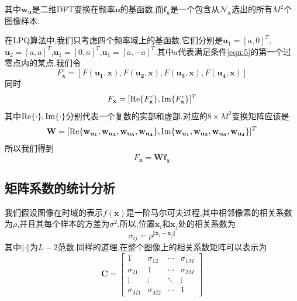 \documentclass[UTF8,adobefonts]{ctexart}
\def\Re{\mathop{\rm Re}}
\def\Im{\mathop{\rm Im}}
\begin{document}
其中$\mathbf{w}_\mathbf{u}$是二维DFT变换在频率$\mathbf{u}$的基函数,而$\mathbf{f}_\mathbf{x}$是一个包含从$\mathcal{N}_\mathbf{x}$选出的所有$M^2$个图像样本.

在LPQ算法中,我们只考虑四个频率域上的基函数,它们分别是$\mathbf{u}_1 = [a,0]^T$,$\mathbf{u}_2 = [a,a]^T$,$\mathbf{u}_1 = [0,a]^T$,$\mathbf{u}_1 = [a,-a]^T$.其中$a$代表满足条件\ref{eqn:5}的第一个过零点内的某点.我们令
\begin{equation}\label{eq:7}
F_\mathbf{x}^c=[F(\mathbf{u_1,x}),F(\mathbf{u_2,x}),F(\mathbf{u_3,x}),F(\mathbf{u_4,x})]
\end{equation}
同时
\begin{equation}\label{eq:8}
F_\mathbf{x}=[\Re\{F_\mathbf{x}^c\},\Im\{F_\mathbf{x}^c\}]^T
\end{equation}
其中$\Re\{\cdot\},\Im\{\cdot\}$分别代表一个复数的实部和虚部.对应的$8 \times M^2$变换矩阵应该是
\begin{equation}\label{eq:9}
\mathbf{W}=[\Re\{\mathbf{w}_\mathbf{u_1},\mathbf{w}_\mathbf{u_2},\mathbf{w}_\mathbf{u_3},\mathbf{w}_\mathbf{u_4}\},\Im\{\mathbf{w}_\mathbf{u_1},\mathbf{w}_\mathbf{u_2},\mathbf{w}_\mathbf{u_3},\mathbf{w}_\mathbf{u_4}\}]^T
\end{equation}
所以我们得到
\begin{equation}\label{eq:10}
F_\mathbf{x}=\mathbf{Wf_x}
\end{equation}


\subsection{矩阵系数的统计分析}
我们假设图像在时域的表示$f(\mathbf{x})$是一阶马尔可夫过程,其中相邻像素的相关系数为$\rho$,并且其每个样本的方差为$\sigma^2$.所以,位置$\mathbf{x}_i$和$\mathbf{x}_j$处的相关系数为
\begin{equation}\label{eq:11}
\sigma_{ij} = \rho^{\Vert \mathbf{x}_i-\mathbf{x}_j \Vert}
\end{equation}
其中$\Vert \cdot \Vert$为$L-2$范数.同样的道理,在整个图像上的相关系数矩阵可以表示为
\begin{equation}\label{eq:12}
\mathbf{C}=\begin{bmatrix}
1 & \sigma_{12}  &  \cdots  &  \sigma_{1M}\\
\sigma_{21} & 1  &  \cdots  &  \sigma_{2M}\\
\vdots & \vdots & \ddots & \vdots\\
\sigma_{M1} &  \sigma_{M2}  &  \cdots  & 1
\end{bmatrix}
\end{equation}
\end{document}
